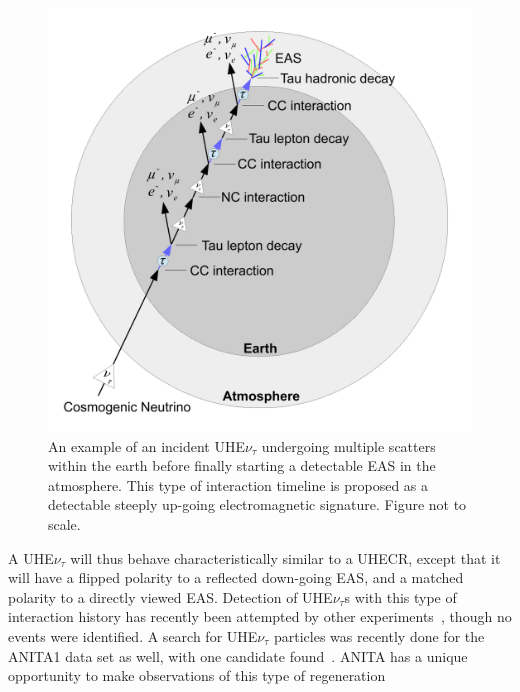 \begin{figure}
\centering
	\includegraphics[width=\textwidth]{figures/TauRegeneration}
	\caption{An example of an incident  UHE$\nu_{\tau}$ undergoing multiple scatters within the earth before finally starting a detectable EAS in the atmosphere.  This type of interaction timeline is proposed as a detectable steeply up-going electromagnetic signature.  Figure not to scale.}
	\label{fig:TauRegeneration}
\end{figure}
		
		A UHE$\nu_{\tau}$ will thus behave characteristically similar to a UHECR, except that it will have a flipped polarity to a reflected down-going EAS, and a matched polarity to a directly viewed EAS.  Detection of UHE$\nu_{\tau}$s with this type of interaction history has recently been attempted by other experiments~\cite{AugerTauSearch}, though no events were identified.  A search for UHE$\nu_{\tau}$ particles was recently done for the ANITA1 data set as well, with one candidate found~\cite{PhysRevD.86.022005}.  ANITA has a unique opportunity to make observations of this type of regeneration 

